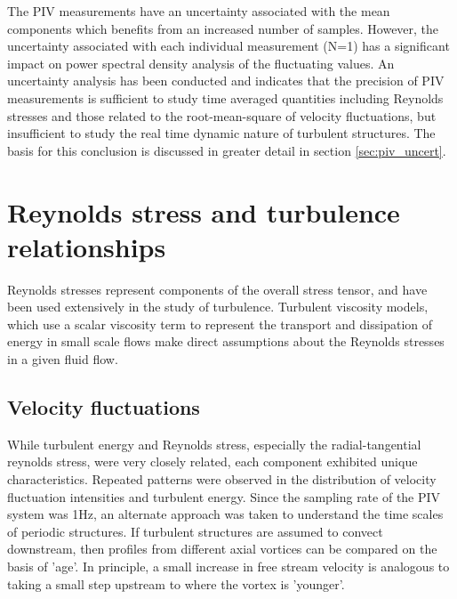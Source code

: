 The PIV measurements have an uncertainty associated with the mean components 
which benefits from an increased number of samples. However, the 
uncertainty associated with each individual measurement (N=1) has a 
significant impact on power spectral density analysis of the fluctuating 
values. An uncertainty analysis has been conducted and indicates that the 
precision of PIV measurements is sufficient to study time averaged quantities 
including Reynolds stresses and those related to the root-mean-square of 
velocity fluctuations, but insufficient to study the real time dynamic nature 
of turbulent structures. The basis for this conclusion is discussed in greater 
detail in section \ref{sec:piv_uncert}.

\section{Reynolds stress and turbulence relationships}

Reynolds stresses represent components of the overall stress tensor, and have 
been used extensively in the study of turbulence. Turbulent viscosity models, 
which use a scalar viscosity term to represent the transport and dissipation of 
energy in small scale flows make direct assumptions about the Reynolds stresses 
in a given fluid flow. 

\subsection{Velocity fluctuations}

While turbulent energy and Reynolds stress, especially the radial-tangential 
reynolds stress, were very closely related, each component exhibited unique 
characteristics. Repeated patterns were observed in the distribution of 
velocity fluctuation intensities and turbulent energy. Since the sampling rate 
of the PIV system was 1Hz, an alternate approach was taken to understand the 
time scales of periodic structures. If turbulent structures are assumed to 
convect downstream, then profiles from different axial vortices can be compared 
on the basis of 'age'. In principle, a small increase in free stream velocity 
is analogous to taking a small step upstream to where the vortex is 'younger'. 

